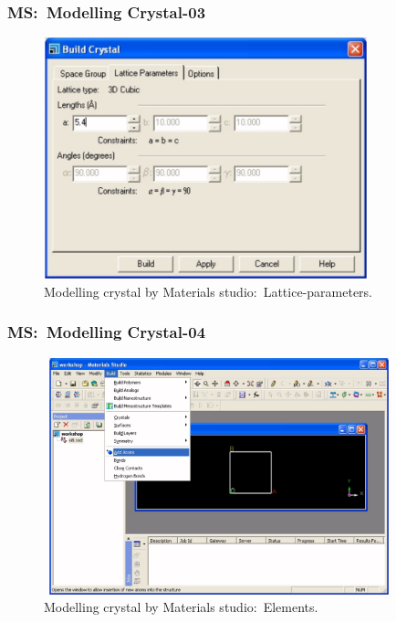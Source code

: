 \frame
{
	\frametitle{\textrm{MS:~Modelling Crystal-03}}
\begin{figure}[h!]
\centering
\vspace*{-0.15in}
\includegraphics[height=2.75in,width=3.70in,viewport=0 0 818 616,clip]{Figures/MS-New_Project-08.png}
\caption{\tiny \textrm{Modelling crystal by Materials studio:~Lattice-parameters.}}%
\label{MS-Modelling-Crystal-03}
\end{figure}
}

\frame
{
	\frametitle{\textrm{MS:~Modelling Crystal-04}}
\begin{figure}[h!]
\centering
\vspace*{-0.10in}
\includegraphics[height=2.70in,width=4.00in,viewport=0 0 1090 759,clip]{Figures/MS-New_Project-09.png}
\caption{\tiny \textrm{Modelling crystal by Materials studio:~Elements.}}%
\label{MS-Modelling-Crystal-04}
\end{figure}
}

